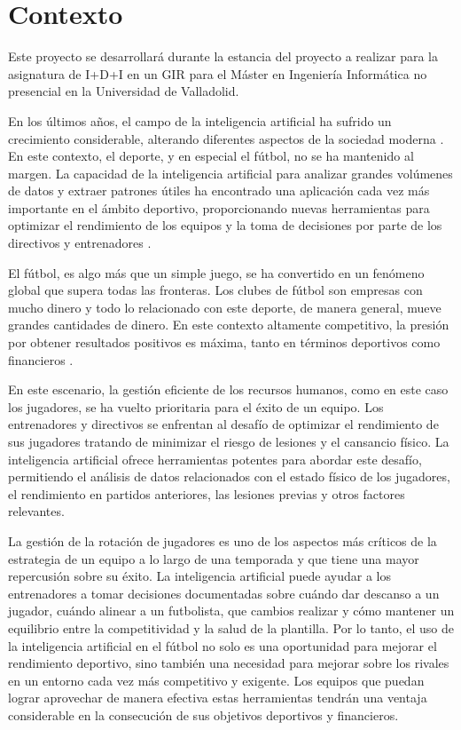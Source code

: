 
\section{Contexto}



Este proyecto se desarrollará durante la estancia del proyecto a realizar para la asignatura de I+D+I en un GIR para el Máster en Ingeniería Informática no presencial en la Universidad de Valladolid.

En los últimos años, el campo de la inteligencia artificial ha sufrido un crecimiento considerable, alterando diferentes aspectos de la sociedad moderna \cite{ia2}. En este contexto, el deporte, y en especial el fútbol, no se ha mantenido al margen. La capacidad de la inteligencia artificial para analizar grandes volúmenes de datos y extraer patrones útiles ha encontrado una aplicación cada vez más importante en el ámbito deportivo, proporcionando nuevas herramientas para optimizar el rendimiento de los equipos y la toma de decisiones por parte de los directivos y entrenadores \cite{ia1}.

El fútbol, es algo más que un simple juego, se ha convertido en un fenómeno global que supera todas las fronteras. Los clubes de fútbol son empresas con mucho dinero y todo lo relacionado con este deporte, de manera general, mueve grandes cantidades de dinero. En este contexto altamente competitivo, la presión por obtener resultados positivos es máxima, tanto en términos deportivos como financieros \cite{dinero}. 

En este escenario, la gestión eficiente de los recursos humanos, como en este caso los jugadores, se ha vuelto prioritaria para el éxito de un equipo. Los entrenadores y directivos se enfrentan al desafío de optimizar el rendimiento de sus jugadores tratando de minimizar el riesgo de lesiones y el cansancio físico. La inteligencia artificial ofrece herramientas potentes para abordar este desafío, permitiendo el análisis de datos relacionados con el estado físico de los jugadores, el rendimiento en partidos anteriores, las lesiones previas y otros factores relevantes.

La gestión de la rotación de jugadores es uno de los aspectos más críticos de la estrategia de un equipo a lo largo de una temporada y que tiene una mayor repercusión sobre su éxito. La inteligencia artificial puede ayudar a los entrenadores a tomar decisiones documentadas sobre cuándo dar descanso a un jugador, cuándo alinear a un futbolista, que cambios realizar y cómo mantener un equilibrio entre la competitividad y la salud de la plantilla. 
Por lo tanto, el uso de la inteligencia artificial en el fútbol no solo es una oportunidad para mejorar el rendimiento deportivo, sino también una necesidad para mejorar sobre los rivales en un entorno cada vez más competitivo y exigente. Los equipos que puedan lograr aprovechar de manera efectiva estas herramientas tendrán una ventaja considerable en la consecución de sus objetivos deportivos y financieros.








